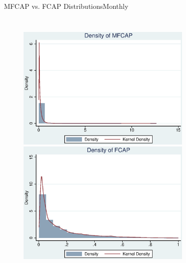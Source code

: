 \documentclass[handout]{beamer}
\begin{document}
			
			\begin{frame}{MFCAP vs. FCAP Distributions}{Monthly}
				\label{Monthly1}
				\begin{columns}
					\begin{figure}
						\centering  
						\includegraphics[width=\linewidth]{"Output/MHistFCA.eps"}\\
						\includegraphics[width=\linewidth]{"Output/MHistFCAP.eps"}
					\end{figure}  
				\pause   
					\begin{figure}
						\centering  

\end{figure}
\end{columns}
\end{frame}
\end{document}
